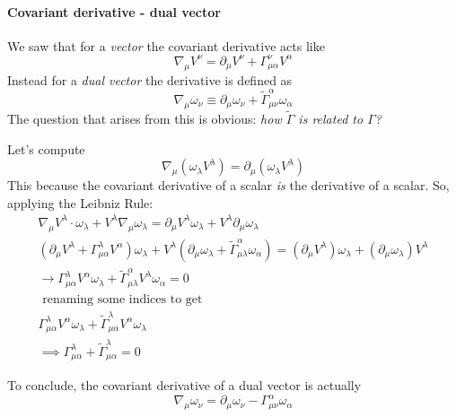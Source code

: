 \paragraph{Covariant derivative - dual vector}
We saw that for a \emph{vector} the covariant derivative acts like
\[
\nabla_{\mu }V^{\nu } = \partial_{\mu }V^{\nu } + \Gamma ^{\nu }_{\mu \alpha }V^{\alpha }
\]
Instead for a \emph{dual vector} the derivative is defined as
\[
\nabla _{\mu} \omega _{\nu } \equiv \partial_{\mu }\omega _{\nu } + \tilde{\Gamma }^{\alpha }_{\mu \nu }\omega _{\alpha }
\]
The question that arises from this is obvious: \emph{how $\tilde{\Gamma }$ is related to $\Gamma $?}\par
Let's compute 
\[
\nabla _{\mu }\left( \omega _{\lambda }V^{\lambda } \right) = \partial_{\mu } \left( \omega _{\lambda }V^{\lambda } \right)
\]
This because the covariant derivative of a scalar \emph{is} the derivative of a scalar. So, applying the Leibniz Rule:
\begin{gather*}
\nabla _{\mu }V^{\lambda }\cdot \omega _{\lambda } + V^{\lambda }\nabla _{\mu }\omega _{\lambda } = \partial_{\mu }V^{\lambda }\omega _{\lambda } + V^{\lambda }\partial_{\mu }\omega _{\lambda } \\
\left( \partial_{\mu }V^{\lambda } + \Gamma ^{\lambda }_{\mu  \alpha }V^{\alpha } \right)\omega _{\lambda } + V^{\lambda }\left( \partial_{\mu }\omega _{\lambda } + \tilde{\Gamma }^{\alpha }_{\mu  \lambda } \omega _{\alpha } \right) = \left( \partial_{\mu }V^{\lambda } \right)\omega _{\lambda }+ \left( \partial_{\mu }\omega _{\lambda } \right)V^{\lambda }\\
\to  \Gamma ^{\lambda }_{\mu  \alpha }V^{\alpha }\omega _{\lambda } + \tilde{\Gamma }^{\alpha }_{\mu \lambda } V^{\lambda }\omega _{\alpha } = 0 \\
\text{ renaming some indices to get }\\
\Gamma ^{\lambda }_{\mu \alpha }V^{\alpha }\omega _{\lambda } + \tilde{\Gamma }^{\lambda }_{\mu  \alpha } V^{\alpha }\omega _{\lambda } \\
\implies \Gamma ^{\lambda }_{\mu \alpha } + \tilde{\Gamma }^{\lambda }_{\mu  \alpha } = 0
\end{gather*}

To conclude, the covariant derivative of a dual vector is actually
\begin{equation}
\nabla _{\mu }\omega_{\nu  }= \partial_{\mu }\omega _{\nu } - \Gamma ^{\alpha }_{\mu \nu }\omega _{\alpha }
\end{equation}
 























